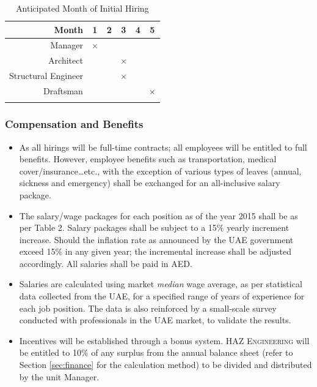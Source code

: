 \documentclass[a4paper,oneside,12pt,final]{article}
\begin{document}
\begin{table}[h]
	\centering
	\begin{tabular}{rccccc}
	\toprule
	\textbf{Month}&\textbf{1}&\textbf{2}&\textbf{3}&\textbf{4}&\textbf{5}\vspace{0.2cm}\\
	\midrule
	Manager&$\times$&&&&\\
	Architect&&&$\times$&&\\
	Structural Engineer&&&$\times$&\\
	Draftsman&&&&&$\times$\\
	\bottomrule
	\label{tab:MonthOfHiring}
	\end{tabular}
	\caption{Anticipated Month of Initial Hiring}
\end{table}

\subsubsection{Compensation and Benefits}

\begin{itemize}[label=\scriptsize$\bullet$]
	\item As all hirings will be full-time contracts; all employees will be entitled to full benefits. However, employee benefits such as transportation, medical cover/insurance\ldots{}etc., with the exception of various types of leaves (annual, sickness and emergency) shall be exchanged for an all-inclusive salary package.
	\item The salary/wage packages for each position as of the year 2015 shall be as per Table 2. Salary packages shall be subject to a 15\% yearly increment increase. Should the inflation rate as announced by the UAE government exceed 15\% in any given year; the incremental increase shall be adjusted accordingly. All salaries shall be paid in AED.
	\item Salaries are calculated using market \emph{median} wage average, as per statistical data collected from the UAE, for a specified range of years of experience for each job position. The data is also reinforced by a small-scale survey conducted with professionals in the UAE market, to validate the results.
	\item Incentives will be established through a bonus system. \textsc{HAZ Engineering} will be entitled to 10\% of any surplus from the annual balance sheet (refer to Section \ref{sec:finance} for the calculation method) to be divided and distributed by the unit Manager.
\end{itemize}
\end{document}
